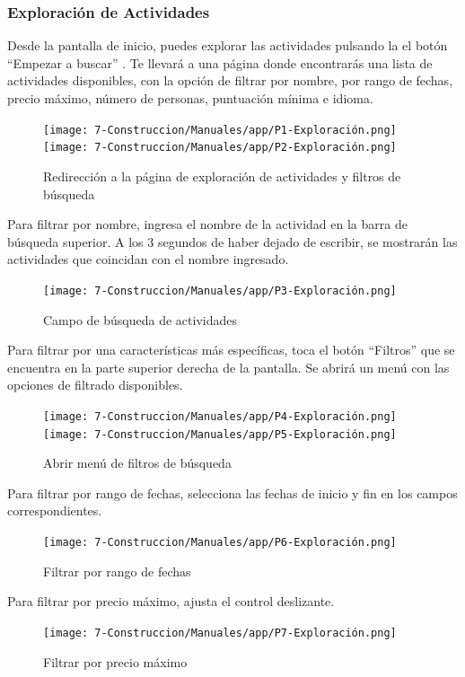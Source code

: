 \subsubsection{Exploración de Actividades}
Desde la pantalla de inicio, puedes explorar las actividades pulsando la el botón “Empezar a buscar” . Te llevará a una página donde encontrarás una lista de actividades disponibles, con la opción de filtrar por nombre, por rango de fechas, precio máximo, número de personas, puntuación mínima e idioma.

\begin{figure}[H]
	\centering
	\texttt{[image: 7-Construccion/Manuales/app/P1-Exploración.png]}
	\texttt{[image: 7-Construccion/Manuales/app/P2-Exploración.png]}
	\caption{Redirección a la página de exploración de actividades y filtros de búsqueda}
\end{figure}

Para filtrar por nombre, ingresa el nombre de la actividad en la barra de búsqueda superior. A los 3 segundos de haber dejado de escribir, se mostrarán las actividades que coincidan con el nombre ingresado.
\begin{figure}[H]
	\centering
	\texttt{[image: 7-Construccion/Manuales/app/P3-Exploración.png]}
	\caption{Campo de búsqueda de actividades}
\end{figure}

Para filtrar por una características más específicas, toca el botón “Filtros” que se encuentra en la parte superior derecha de la pantalla.
Se abrirá un menú con las opciones de filtrado disponibles.
\begin{figure}[H]
	\centering
	\texttt{[image: 7-Construccion/Manuales/app/P4-Exploración.png]}
	\texttt{[image: 7-Construccion/Manuales/app/P5-Exploración.png]}
	\caption{Abrir menú de filtros de búsqueda}
\end{figure}

Para filtrar por rango de fechas, selecciona las fechas de inicio y fin en los campos correspondientes.
\begin{figure}[H]
	\centering
	\texttt{[image: 7-Construccion/Manuales/app/P6-Exploración.png]}
	\caption{Filtrar por rango de fechas}
\end{figure}

Para filtrar por precio máximo, ajusta el control deslizante.
\begin{figure}[H]
	\centering
	\texttt{[image: 7-Construccion/Manuales/app/P7-Exploración.png]}
	\caption{Filtrar por precio máximo}
\end{figure}

